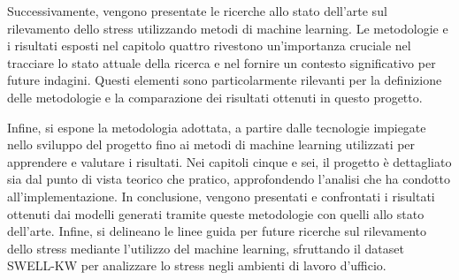 \bigskip

Successivamente, vengono presentate le ricerche allo stato dell'arte sul rilevamento dello stress utilizzando metodi di machine learning. Le metodologie e i risultati esposti nel capitolo quattro rivestono un'importanza cruciale nel tracciare lo stato attuale della ricerca e nel fornire un contesto significativo per future indagini. Questi elementi sono particolarmente rilevanti per la definizione delle metodologie e la comparazione dei risultati ottenuti in questo progetto.

\bigskip

Infine, si espone la metodologia adottata, a partire dalle tecnologie impiegate nello sviluppo del progetto fino ai metodi di machine learning utilizzati per apprendere e valutare i risultati. Nei capitoli cinque e sei, il progetto è dettagliato sia dal punto di vista teorico che pratico, approfondendo l'analisi che ha condotto all'implementazione. In conclusione, vengono presentati e confrontati i risultati ottenuti dai modelli generati tramite queste metodologie con quelli allo stato dell'arte. Infine, si delineano le linee guida per future ricerche sul rilevamento dello stress mediante l'utilizzo del machine learning, sfruttando il dataset SWELL-KW per analizzare lo stress negli ambienti di lavoro d'ufficio.